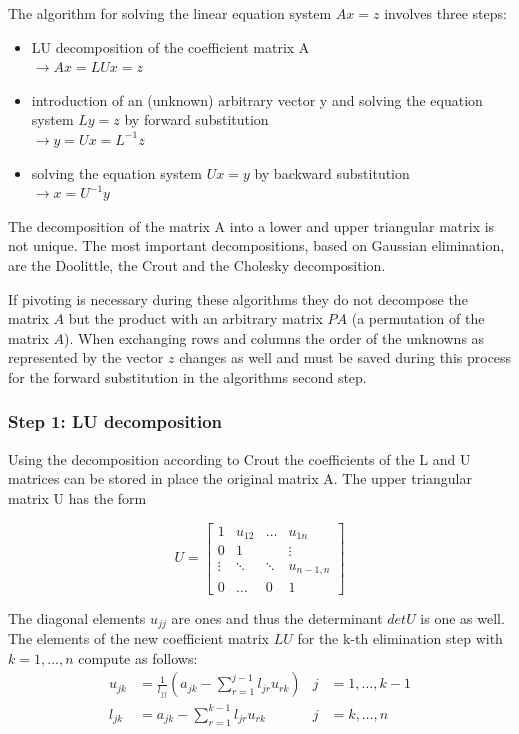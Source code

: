 \documentclass[10pt]{report}
\begin{document}
The algorithm for solving the linear equation system $Ax = z$ involves
three steps:
\begin{itemize}
\item LU decomposition of the coefficient matrix A\\
$\rightarrow Ax = LUx = z$
\item introduction of an (unknown) arbitrary vector y and solving the equation system $Ly = z$ by forward substitution\\
$\rightarrow y = Ux = L^{-1}z$
\item solving the equation system $Ux = y$  by backward substitution\\
$\rightarrow x = U^{-1}y$
\end{itemize}

The decomposition of the matrix A into a lower and upper triangular
matrix is not unique.  The most important decompositions, based on
Gaussian elimination, are the Doolittle, the Crout and the Cholesky
decomposition.

\addvspace{12pt}

If pivoting is necessary during these algorithms they do not decompose
the matrix $A$ but the product with an arbitrary matrix $PA$ (a
permutation of the matrix $A$).  When exchanging rows and columns the
order of the unknowns as represented by the vector $z$ changes as well
and must be saved during this process for the forward substitution in
the algorithms second step.

\subsubsection{Step 1: LU decomposition}

Using the decomposition according to Crout the coefficients of the L
and U matrices can be stored in place the original matrix A.  The
upper triangular matrix U has the form

\begin{equation}
U = 
\begin{bmatrix}
1 & u_{12} & \ldots & u_{1n}\\
0 & 1 &  & \vdots\\
\vdots & \ddots & \ddots & u_{n-1,n}\\
0 & \ldots & 0 & 1
\end{bmatrix}
\label{eq:CroutU}
\end{equation}

The diagonal elements $u_{jj}$ are ones and thus the determinant $det
U$ is one as well.  The elements of the new coefficient matrix $LU$
for the k-th elimination step with $k = 1, \ldots,n$ compute as
follows:
\begin{align}
u_{jk} &= \frac{1}{l_{jj}}\left(a_{jk} - \sum_{r=1}^{j-1} l_{jr} u_{rk}\right) & j &= 1,\ldots,k-1\\
l_{jk} &= a_{jk} - \sum_{r=1}^{k-1} l_{jr} u_{rk} & j &= k,\ldots,n
\end{align}
\end{document}
